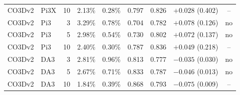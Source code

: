 \begin{tabular}{llrcccccc}
CO3Dv2 & Pi3X & 10 & 2.13\% & 0.28\% & 0.797 & 0.826 & $+0.028$ (0.402) & -- \\
CO3Dv2 & Pi3 & 3 & 3.29\% & 0.78\% & 0.704 & 0.782 & $+0.078$ (0.126) & no \\
CO3Dv2 & Pi3 & 5 & 2.98\% & 0.54\% & 0.730 & 0.802 & $+0.072$ (0.137) & no \\
CO3Dv2 & Pi3 & 10 & 2.40\% & 0.30\% & 0.787 & 0.836 & $+0.049$ (0.218) & -- \\
CO3Dv2 & DA3 & 3 & 2.81\% & 0.96\% & 0.813 & 0.777 & $-0.035$ (0.030) & no \\
CO3Dv2 & DA3 & 5 & 2.67\% & 0.71\% & 0.833 & 0.787 & $-0.046$ (0.013) & no \\
CO3Dv2 & DA3 & 10 & 1.84\% & 0.39\% & 0.868 & 0.793 & $-0.075$ (0.009) & -- \\
\bottomrule
\end{tabular}

